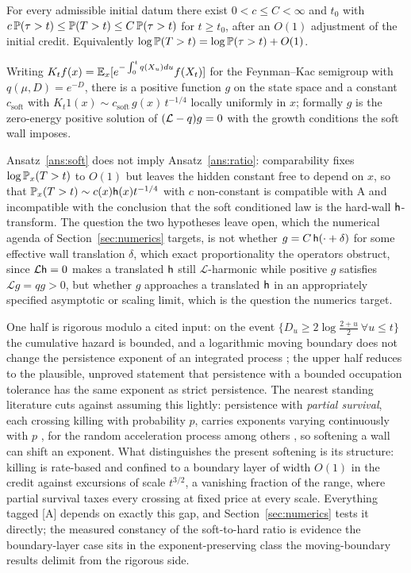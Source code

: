 \begin{ansatz}\label{ans:soft}
For every admissible initial datum there exist
$0<c\le C<\infty$ and $t_0$ with
$c\,\mathbb{P}(\tau>t)\le\mathbb{P}(T>t)\le C\,\mathbb{P}(\tau>t)$ for $t\ge t_0$, after an
$O(1)$ adjustment of the initial credit. Equivalently
$\log\mathbb{P}(T>t)=\log\mathbb{P}(\tau>t)+O(1)$.
\end{ansatz}

\begin{ansatz}\label{ans:ratio}
Writing $K_tf(x)=\mathbb{E}_x[e^{-\int_0^tq(X_u)du}f(X_t)]$ for the
Feynman--Kac semigroup with $q(\mu,D)=e^{-D}$, there is a positive
function $g$ on the state space and a constant $c_{\mathrm{soft}}$ with
$K_t1(x)\sim c_{\mathrm{soft}}\,g(x)\,t^{-1/4}$ locally uniformly in
$x$; formally $g$ is the zero-energy positive solution of
$(\mathcal{L}-q)g=0$ with the growth conditions the soft wall imposes.
\end{ansatz}

\noindent Ansatz~\ref{ans:soft} does not imply Ansatz~\ref{ans:ratio}:
comparability fixes $\log\mathbb{P}_x(T>t)$ to $O(1)$ but leaves the hidden
constant free to depend on $x$, so that $\mathbb{P}_x(T>t)\sim c(x)\mathsf{h}(x)t^{-1/4}$
with $c$ non-constant is compatible with A and incompatible with the
conclusion that the soft conditioned law is the hard-wall
$\mathsf{h}$-transform. The question the two hypotheses leave open, which
the numerical agenda of Section~\ref{sec:numerics} targets, is not whether $g = C\,\mathsf{h}(\cdot + \delta)$ for some effective wall translation $\delta$, which exact proportionality the operators obstruct, since $\mathcal{L}\mathsf{h} = 0$ makes a translated $\mathsf{h}$ still $\mathcal{L}$-harmonic while positive $g$ satisfies $\mathcal{L} g = q g > 0$, but whether $g$ approaches a translated $\mathsf{h}$ in an appropriately specified asymptotic or scaling limit, which is the question the numerics target.

One half is rigorous modulo a cited input: on the event
$\{D_u\ge2\log\frac{2+u}{2}\ \forall u\le t\}$ the cumulative hazard
is bounded, and a logarithmic moving boundary does not change the
persistence exponent of an integrated process \cite{AS15,DW15}; the
upper half reduces to the plausible, unproved statement that
persistence with a bounded occupation tolerance has the same exponent
as strict persistence. The nearest standing literature cuts against
assuming this lightly: persistence with \emph{partial survival}, each crossing killing with probability $p$, carries exponents
varying continuously with $p$ \cite{MB98}, for the random acceleration
process among others \cite{Bur14}, so softening a wall can shift an
exponent. What distinguishes the present softening is its structure:
killing is rate-based and confined to a boundary layer of width $O(1)$
in the credit against excursions of scale $t^{3/2}$, a vanishing
fraction of the range, where partial survival taxes every crossing
at fixed price at every scale. Everything tagged [A] depends on exactly
this gap, and Section~\ref{sec:numerics} tests it directly; the
measured constancy of the soft-to-hard ratio is evidence the
boundary-layer case sits in the exponent-preserving class the
moving-boundary results delimit from the rigorous side.

